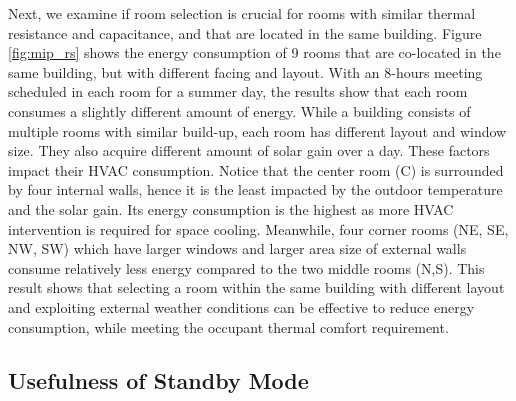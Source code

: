 Next, we examine if room selection is crucial for rooms with similar thermal resistance and capacitance, and that are located in the same building. Figure \ref{fig:mip_rs} shows the energy consumption of 9 rooms that are co-located in the same building, but with different facing and layout. With an 8-hours meeting scheduled in each room for a summer day, the results show that each room consumes a slightly different amount of energy. While a building consists of multiple rooms with similar build-up, each room has different layout and window size. They also acquire different amount of solar gain over a day. These factors impact their HVAC consumption. Notice that the center room (C) is surrounded by four internal walls, hence it is the least impacted by the outdoor temperature and the solar gain. Its energy consumption is the highest as more HVAC intervention is required for space cooling. Meanwhile, four corner rooms (NE, SE, NW, SW) which have larger windows and larger area size of external walls consume relatively less energy compared to the two middle rooms (N,S). This result shows that selecting a room within the same building with different layout and exploiting external weather conditions can be effective to reduce energy consumption, while meeting the occupant thermal comfort requirement.

\subsection{Usefulness of Standby Mode}
\label{subsec:experiments:standby}

